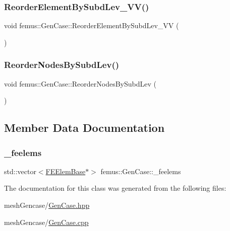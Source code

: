\mbox{\label{classfemus_1_1_gen_case_ac8a4b195137869e5aea20553baa8b37d}} 
\subsubsection{\texorpdfstring{Reorder\+Element\+By\+Subd\+Lev\+\_\+\+V\+V()}{ReorderElementBySubdLev\_VV()}}
{\footnotesize\ttfamily void femus\+::\+Gen\+Case\+::\+Reorder\+Element\+By\+Subd\+Lev\+\_\+\+VV (\begin{DoxyParamCaption}{ }\end{DoxyParamCaption})}

\mbox{\label{classfemus_1_1_gen_case_a2c8dce7f34c3d4331c677c224d601fe2}} 
\subsubsection{\texorpdfstring{Reorder\+Nodes\+By\+Subd\+Lev()}{ReorderNodesBySubdLev()}}
{\footnotesize\ttfamily void femus\+::\+Gen\+Case\+::\+Reorder\+Nodes\+By\+Subd\+Lev (\begin{DoxyParamCaption}{ }\end{DoxyParamCaption})}



\subsection{Member Data Documentation}
\mbox{\label{classfemus_1_1_gen_case_a55901caa3145de289eb90be709f54045}} 
\subsubsection{\texorpdfstring{\+\_\+feelems}{\_feelems}}
{\footnotesize\ttfamily std\+::vector$<$\mbox{\hyperlink{classfemus_1_1_f_e_elem_base}{F\+E\+Elem\+Base}}$\ast$$>$ femus\+::\+Gen\+Case\+::\+\_\+feelems}



The documentation for this class was generated from the following files\+:\begin{DoxyCompactItemize}
\item 
mesh\+Gencase/\mbox{\hyperlink{_gen_case_8hpp}{Gen\+Case.\+hpp}}\item 
mesh\+Gencase/\mbox{\hyperlink{_gen_case_8cpp}{Gen\+Case.\+cpp}}\end{DoxyCompactItemize}
